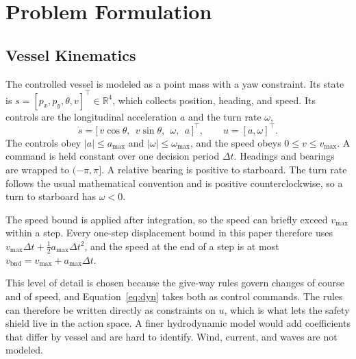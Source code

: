 \documentclass[10pt,letterpaper]{article}
\begin{document}
\section{Problem Formulation}
\label{sec:problem-setup}

\subsection{Vessel Kinematics}
\label{sec:model}

The controlled vessel is modeled as a point mass with a yaw constraint. Its state is
$s=[p_x,p_y,\theta,v]^{\!\top}\in\mathbb{R}^4$, which collects position, heading, and speed.
Its controls are the longitudinal acceleration $a$ and the turn rate $\omega$,
\begin{equation}
 \dot s=\bigl[\,v\cos\theta,\ \ v\sin\theta,\ \ \omega,\ \ a\,\bigr]^{\!\top},
 \qquad u=[a,\omega]^{\!\top}.
 \label{eq:dyn}
\end{equation}
The controls obey $|a|\le a_{\max}$ and $|\omega|\le\omega_{\max}$, and the speed obeys
$0\le v\le v_{\max}$. A command is held constant over one decision period $\Delta t$.
Headings and bearings are wrapped to $(-\pi,\pi]$. A relative bearing is positive to
starboard. The turn rate follows the usual mathematical convention and is positive counterclockwise, so a turn to starboard has $\omega<0$.

The speed bound is applied after integration, so the speed can briefly exceed $v_{\max}$
within a step. Every one-step displacement bound in this paper therefore uses
$v_{\max}\Delta t+\tfrac12 a_{\max}\Delta t^2$, and the speed at the end of a step is at
most $v_{\mathrm{bnd}}=v_{\max}+a_{\max}\Delta t$.

This level of detail is chosen because the give-way rules govern changes of course and
of speed, and Equation~\eqref{eq:dyn} takes both as control commands. The rules can
therefore be written directly as constraints on $u$, which is what lets the safety
shield live in the action space. A finer hydrodynamic model would add coefficients that
differ by vessel and are hard to identify. Wind, current, and waves are not modeled.
\end{document}
